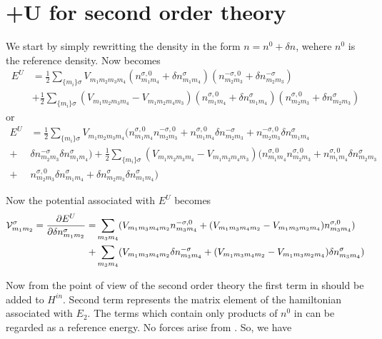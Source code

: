 \section{+U for second order theory}
\par{We start by simply rewritting the density in the form $n=n^0+\delta n$, wehere $n^0$ is the reference density.
Now  becomes}
\begin{equation}
\begin{split}
E^U&=\frac{1}{2}\sum_{\{m_i\}\sigma}V_{m_1m_2m_3m_4}(n_{m_1m_4}^{\sigma, 0}+\delta n_{m_1m_4}^{\sigma})(n_{m_2m_3}^{-\sigma,0}+\delta n_{m_2m_3}^{-\sigma})\\&+
\frac{1}{2}\sum_{\{m_i\}\sigma}(V_{m_1m_2m_3m_4}-V_{m_1m_2m_4m_3})
(n_{m_1m_4}^{\sigma,0}+\delta n_{m_1m_4}^{\sigma})(n_{m_2m_3}^{\sigma,0}+\delta n_{m_2m_3}^{\sigma})
\end{split}
\end{equation}
or
\begin{equation}
\label{eu2}
\begin{split}
E^U&=\frac{1}{2}\sum_{\{m_i\}\sigma}V_{m_1m_2m_3m_4}( n_{m_1m_4}^{\sigma, 0}n_{m_2m_3}^{-\sigma,0}+n_{m_1m_4}^{\sigma, 0}\delta n_{m_2m_3}^{-\sigma}
+ n_{m_2m_3}^{-\sigma,0}\delta n_{m_1m_4}^{\sigma}\\+& \delta n_{m_2m_3}^{-\sigma}\delta n_{m_1m_4}^{\sigma})+
\frac{1}{2}\sum_{\{m_i\}\sigma}(V_{m_1m_2m_3m_4}-V_{m_1m_2m_4m_3})
(n_{m_1m_4}^{\sigma, 0}n_{m_2m_3}^{\sigma,0}+n_{m_1m_4}^{\sigma, 0}\delta n_{m_2m_3}^{\sigma}
\\+& n_{m_2m_3}^{\sigma,0}\delta n_{m_1m_4}^{\sigma}+ \delta n_{m_2m_3}^{\sigma}\delta n_{m_1m_4}^{\sigma})
\end{split}
\end{equation}
\par{Now the potential associated with $E^U$ becomes}
%
\begin{equation}
\label{hamU}
\begin{split}
\mathcal{V}_{m_1m_2}^{\sigma}=\frac{\partial E^U}{\partial \delta n_{m_1m_2}^{\sigma}}=&\sum_{m_3m_4}(V_{m_1m_3m_4m_2}
n_{m_3m_4}^{-\sigma,0}+(V_{m_1m_3m_4m_2}-V_{m_1m_3m_2m_4})n_{m_3m_4}^{\sigma,0})\\
+&\sum_{m_3m_4}(V_{m_1m_3m_4m_2}
\delta n_{m_3m_4}^{-\sigma}+(V_{m_1m_3m_4m_2}-V_{m_1m_3m_2m_4})\delta n_{m_3m_4}^{\sigma})
\end{split}
\end{equation}
%
\par{Now from the point of view of the second order theory the first term in  should be added to $H^{in}$.
Second term represents the matrix element of the hamiltonian
associated with $E_2$. The terms which contain only products of $n^0$ in  can be regarded as a reference energy. No forces arise from . So, we have}
